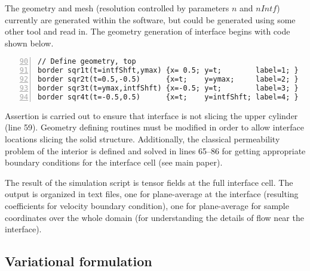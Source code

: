 \documentclass[12pt,a4paper]{article}
\begin{document}
The geometry and mesh (resolution controlled by parameters $n$ and $nIntf$) currently are generated within the software, but could be generated using some other tool and read in. The geometry generation of interface begins with code shown below.
\begin{lstlisting}[numbers=left,firstnumber=90]
// Define geometry, top
border sqr1t(t=intfShft,ymax) {x= 0.5; y=t;        label=1; }
border sqr2t(t=0.5,-0.5)      {x=t;    y=ymax;     label=2; }
border sqr3t(t=ymax,intfShft) {x=-0.5; y=t;        label=3; }
border sqr4t(t=-0.5,0.5)      {x=t;    y=intfShft; label=4; }
\end{lstlisting}

Assertion is carried out to ensure that interface is not slicing the upper cylinder (line 59). Geometry defining routines must be modified in order to allow interface locations slicing the solid structure. Additionally, the classical permeability problem of the interior is defined and solved in lines 65--86 for getting appropriate boundary conditions for the interface cell (see main paper).

The result of the simulation script is tensor fields at the full interface cell. The output is organized in text files, one for plane-average at the interface (resulting coefficients for velocity boundary condition), one for plane-average for sample coordinates over the whole domain (for understanding the details of flow near the interface).

\subsection{Variational formulation}
\end{document}
